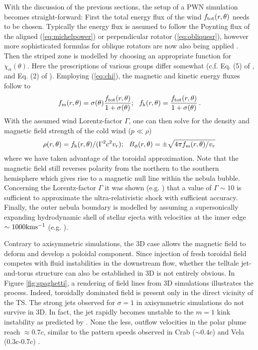 With the discussion of the previous sections, the setup of a PWN simulation becomes straight-forward:  
First the total energy flux of the wind $f_{\rm tot}(r,\theta)$ needs to be chosen. Typically the energy flux is assumed to follow the Poynting flux of the aligned (\ref{eq:michelpower}) or perpendicular rotator (\ref{eq:obliquesr}), however more sophisticated formulas for oblique rotators are now also being applied \citep[see][]{BuhlerGiomi2016}.  
Then the striped zone is modelled by choosing an appropriate function for $\chi_\alpha(\theta)$.  Here the prescriptions of various groups differ somewhat (c.f. Eq. (5) of \cite{PorthKomissarov2013}, and Eq. (2) of \cite{2014MNRAS.438.1518O}).  Employing {\cred (\ref{eq:chi})}, the magnetic and kinetic energy fluxes follow to
\begin{align}
	f_{\rm m}(r,\theta) = \sigma(\theta)\frac{f_{\rm tot}(r,\theta)}{1+\sigma(\theta)};\ \ f_{\rm k}(r,\theta) = \frac{f_{\rm tot}(r,\theta)}{1+\sigma(\theta)}\, .
\end{align}
With the assumed wind Lorentz-factor $\Gamma$, one can then solve for the density and magnetic field strength of the cold wind ($p\ll\rho$) 
\begin{align}
\rho(r,\theta) = f_{\rm k}(r,\theta)/(\Gamma^2c^2v_{r});\ \ B_{\phi}(r,\theta)=\pm\sqrt{4\pi f_{\rm m}(r,\theta)/v_r}
\end{align}
where we have taken advantage of the toroidal approximation.  Note that the magnetic field still reverses polarity from the northern to the southern hemisphere which gives rise to a magnetic null line within the nebula bubble.  Concerning the Lorentz-factor $\Gamma$ it was shown (e.g. \cite{komissarov2004}) that a value of $\Gamma\sim10$ is sufficient to approximate the ultra-relativistic shock with sufficient accuracy.  
Finally, the outer nebula boundary is modelled by assuming a supersonically expanding hydrodynamic shell of stellar ejecta with velocities at the inner edge $\sim1000\rm km s^{-1}$ (e.g. \cite{del-zanna2004}).  

Contrary to axisymmetric simulations, the 3D case allows the magnetic field to deform and develop a poloidal component.  Since injection of fresh toroidal field competes with fluid instabilities in the downstream flow, whether the telltale jet-and-torus structure can also be established in 3D is not entirely obvious.  
In Figure \ref{fig:spaghetti}, a rendering of field lines from 3D simulations illustrates the process.  Indeed, toroidally dominated field is present only in the direct vicinity of the TS.  
The strong jets observed for $\sigma=1$ in axisymmetric simulations do not survive in 3D. In fact, the jet rapidly becomes unstable to the $m=1$ kink instability as predicted by \cite{begelman1998}.  None the less, outflow velocities in the polar plume reach $\approx0.7c$, similar to the pattern speeds observed in Crab ($\sim 0.4c$) \citep{hester2002} and Vela (0.3c-0.7c) \citep{PavlovTeter2003}.  

